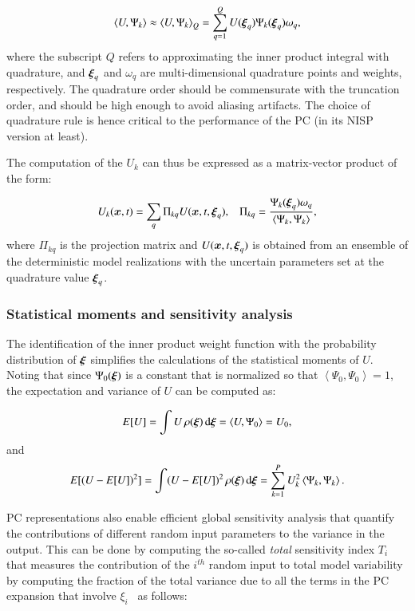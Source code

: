 \begin{equation}
  \left< U, \Psi_k \right> 
\approx \left< U, \Psi_k \right>_Q
= \sum_{q=1}^Q U(\xxi_q) \Psi_k(\xxi_q) \omega_q,
\end{equation}
where the subscript $Q$ refers to approximating the inner product integral with
quadrature, and $\xxi_q$ and $\omega_q$ are multi-dimensional quadrature points and weights,
respectively. The quadrature order should be commensurate with the
truncation order, and should be high enough to avoid aliasing artifacts.
The choice of quadrature rule is hence critical to the performance
of the PC (in its NISP version at least).

The computation of the ${U}_k$ can thus be expressed as a matrix-vector product of the form:

\begin{equation} 
 U_k(\bm{x},t)=\sum_q \Pi_{kq} U(\bm{x},t,\xxi_q),\;\;\;
 \Pi_{kq}=\frac{\Psi_k(\xxi_q)\omega_q}{\left< \Psi_k, \Psi_k \right>},
\label{eq:nisp}
\end{equation} 
where $\Pi_{kq}$ is the projection matrix and $U(\bm{x},t,\xxi_q)$ is obtained
from an ensemble of the deterministic model realizations with the uncertain parameters set at
the quadrature value $\xxi_q$. 


\subsubsection{Statistical moments and sensitivity analysis}
The identification of the inner product weight function
with the probability distribution of $\xxi$ simplifies the calculations of the statistical moments of $U$. 
Noting that since $\Psi_0(\xxi)$ is a constant that is normalized so that 
$\left<\Psi_0,\Psi_0\right>=1$, the expectation and variance of $U$ can be computed as:

\begin{equation}
 E[U] = \int U \, \rho(\xxi) \, \mbox{d}\xxi=\left< U,\Psi_0\right> = U_0,  
 \label{eq:mean}
\end{equation}
and \begin{equation}
 E[(U-E[U])^2] = \int (U-E[U])^2 \, \rho(\xxi) \, \mbox{d}\xxi=\sum_{k=1}^P U_k^2
 \label{eq:sigma}
\left<\Psi_k,\Psi_k\right>.
\end{equation}

PC representations also enable
efficient global sensitivity analysis that quantify the
contributions of different random input parameters to the variance in the output.
This can be done by computing the so-called {\it total} 
sensitivity index $T_i$ that measures the contribution of
the $i^{th}$ random input to total model variability by
computing the fraction of the total variance due to all the terms in the
PC expansion that involve $\xi_i$~\citep{LeMaitreKnio2010,Crestaux,Sudret}
as follows:

